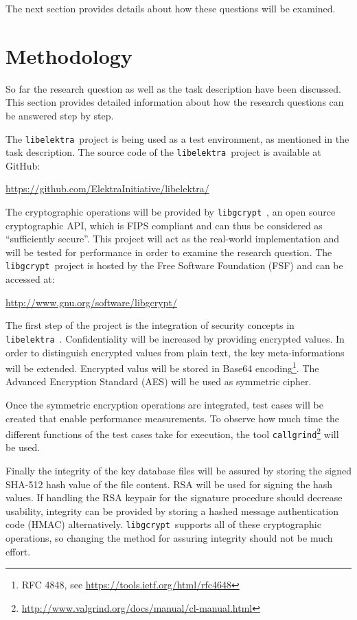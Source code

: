 \documentclass[a4paper,12pt]{article}
\newcommand{\libelektra}{\texttt{libelektra}~}
\newcommand{\libgcrypt}{\texttt{libgcrypt}~}
\begin{document}
The next section provides details about how these questions will be examined.


\section{Methodology}

So far the research question as well as the task description have been discussed.
This section provides detailed information about how the research questions can be answered step by step.

The \libelektra project is being used as a test environment, as mentioned in the task description.
The source code of the \libelektra project is available at GitHub:

\url{https://github.com/ElektraInitiative/libelektra/}

The cryptographic operations will be provided by \libgcrypt, an open source cryptographic API, which is FIPS compliant and can thus be considered as ``sufficiently secure''.
This project will act as the real-world implementation and will be tested for performance in order to examine the research question.
The \libgcrypt project is hosted by the Free Software Foundation (FSF) and can be accessed at:

\url{http://www.gnu.org/software/libgcrypt/}

The first step of the project is the integration of security concepts in \libelektra. Confidentiality will be increased by providing encrypted values. In order to distinguish encrypted values from plain text, the key meta-informations will be extended. Encrypted valus will be stored in Base64 encoding\footnote{RFC 4848, see \url{https://tools.ietf.org/html/rfc4648}}. The Advanced Encryption Standard (AES) will be used as symmetric cipher.

Once the symmetric encryption operations are integrated, test cases will be created that enable performance measurements.
To observe how much time the different functions of the test cases take for execution, the tool \texttt{callgrind}\footnote{\url{http://www.valgrind.org/docs/manual/cl-manual.html}} will be used.

Finally the integrity of the key database files will be assured by storing the signed SHA-512 hash value of the file content. RSA will be used for signing the hash values. If handling the RSA keypair for the signature procedure should decrease usability, integrity can be provided by storing a hashed message authentication code (HMAC) alternatively. \libgcrypt supports all of these cryptographic operations, so changing the method for assuring integrity should not be much effort.
\end{document}
